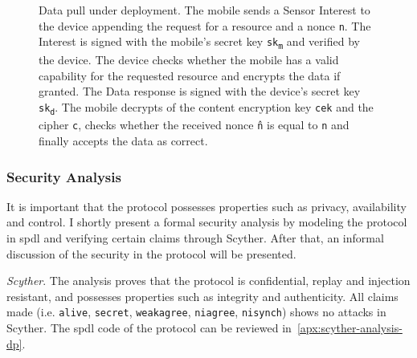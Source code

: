 \begin{figure}[ht]
  \caption[Data pull under deployment]{Data pull under deployment. 
  The mobile sends a Sensor Interest to the device appending the request for a resource and a nonce \texttt{n}. 
  The Interest is signed with the mobile's secret key \texttt{sk\textsubscript{m}} and verified by the device. 
  The device checks whether the mobile has a valid capability for the requested resource and encrypts the data if granted.
  The Data response is signed with the device's secret key \texttt{sk\textsubscript{d}}.
  The mobile decrypts of the content encryption key \texttt{cek} and the cipher \texttt{c}, checks whether the received nonce \texttt{\^{n}} is equal to \texttt{n} and finally accepts the data as correct.}
  \label{fig:data_pull_ibe}
\end{figure}


\subsubsection{Security Analysis}
It is important that the protocol possesses properties such as privacy, availability and control. 
I shortly present a formal security analysis by modeling the protocol in \gls{spdl} and verifying certain claims through Scyther.
After that, an informal discussion of the security in the protocol will be presented.

\textit{Scyther}.
The analysis proves that the protocol is confidential, replay and injection resistant, and possesses properties such as integrity and authenticity.
All claims made (i.e. \texttt{alive}, \texttt{secret}, \texttt{weakagree}, \texttt{niagree}, \texttt{nisynch}) shows no attacks in Scyther. 
The \gls{spdl} code of the protocol can be reviewed in~\autoref{apx:scyther-analysis-dp}.

